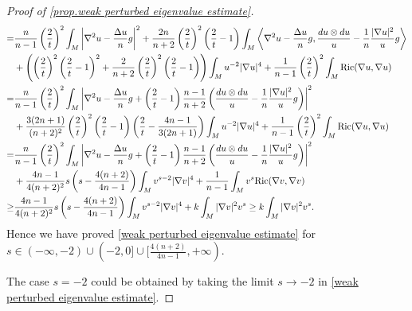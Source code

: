 \documentclass[12pt]{amsart}
\numberwithin{equation}{section}
\numberwithin{lemma}{section}
\numberwithin{proposition}{section}
\numberwithin{corollary}{section}
\numberwithin{remark}{section}
\begin{document}
\begin{proof}[Proof of \cref{prop.weak perturbed eigenvalue estimate}]
\begin{align*}
        =&\frac{n}{n-1}
        \left(\frac{2}{t}\right)^2
        \int_M \left|\nabla^2 u-\frac{\Delta u}{n}g\right|^2
        +\frac{2n}{n+2}
        \left(\frac{2}{t}\right)^2
        \left(\frac{2}{t}-1\right)
        \int_M \left\langle\nabla^2 u-\frac{\Delta u}{n}g,\frac{du\otimes du}{u}-\frac{1}{n}\frac{|\nabla u|^2}{u}g\right\rangle\\\notag
        &+\left(\left(\frac{2}{t}\right)^2\left(\frac{2}{t}-1\right)^2
        +\frac{2}{n+2}\left(\frac{2}{t}\right)^2
        \left(\frac{2}{t}-1\right)
        \right)
        \int_M u^{-2}|\nabla u|^4
        +\frac{1}{n-1}\left(\frac{2}{t}\right)^2
        \int_M \mathrm{Ric}(\nabla u,\nabla u)\\\notag
        =&\frac{n}{n-1}
        \left(\frac{2}{t}\right)^2\int_M\left|\nabla ^2u-\frac{\Delta u}{n}g
        +\left(\frac{2}{t}-1\right)\frac{n-1}{n+2}
        \left(\frac{du\otimes du}{u}-\frac{1}{n}\frac{|\nabla u|^2}{u}g\right)
        \right|^2\\\notag
        &+\frac{3(2n+1)}{(n+2)^2} 
        \left(\frac{2}{t}\right)^2 \left(\frac{2}{t}-1\right)\left(\frac{2}{t}-\frac{4n-1}{3(2n+1)}\right)\int_M u^{-2}|\nabla u|^4
        +\frac{1}{n-1}
        \left(\frac{2}{t}\right)^2\int_M \mathrm{Ric}(\nabla u,\nabla u)\\\notag
        =&\frac{n}{n-1}
        \left(\frac{2}{t}\right)^2
        \int_M\left|\nabla ^2u-\frac{\Delta u}{n}g
        +\left(\frac{2}{t}-1\right)
        \frac{n-1}{n+2}
        \left(\frac{du\otimes du}{u}-\frac{1}{n}\frac{|\nabla u|^2}{u}g\right)
        \right|^2\\ \notag
        &+\frac{4n-1}{4(n+2)^2}s
        \left(s-\frac{4(n+2)}{4n-1}\right)
        \int_M v^{s-2}|\nabla v|^4
        +\frac{1}{n-1}\int_Mv^s\mathrm{Ric}(\nabla v,\nabla v)\notag\\
        \geq&\frac{4n-1}{4(n+2)^2}s
        \left(s-\frac{4(n+2)}{4n-1}\right)
        \int_M v^{s-2}|\nabla v|^4
        + k\int_M |\nabla v|^2v^{s}
        \geq k\int_M |\nabla v|^2v^{s}.
    \end{align*}
    Hence we have proved \cref{weak perturbed eigenvalue estimate} for $s\in (-\infty, -2)\cup(-2,0]\cup [\frac{4(n+2)}{4n-1},+\infty)$.
    
    The case $s=-2$ could be obtained by taking the limit $s\to -2$ in \cref{weak perturbed eigenvalue estimate}.
    \end{proof}    
\end{document}

